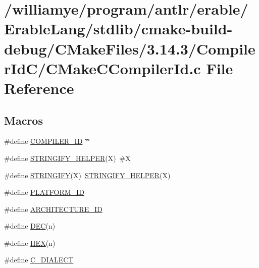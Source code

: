 \hypertarget{stdlib_2cmake-build-debug_2_c_make_files_23_814_83_2_compiler_id_c_2_c_make_c_compiler_id_8c}{}\section{/williamye/program/antlr/erable/\+Erable\+Lang/stdlib/cmake-\/build-\/debug/\+C\+Make\+Files/3.14.3/\+Compiler\+Id\+C/\+C\+Make\+C\+Compiler\+Id.c File Reference}
\label{stdlib_2cmake-build-debug_2_c_make_files_23_814_83_2_compiler_id_c_2_c_make_c_compiler_id_8c}
\subsection*{Macros}
\begin{DoxyCompactItemize}
\item 
\#define \mbox{\hyperlink{stdlib_2cmake-build-debug_2_c_make_files_23_814_83_2_compiler_id_c_2_c_make_c_compiler_id_8c_a81dee0709ded976b2e0319239f72d174}{C\+O\+M\+P\+I\+L\+E\+R\+\_\+\+ID}}~\char`\"{}\char`\"{}
\item 
\#define \mbox{\hyperlink{stdlib_2cmake-build-debug_2_c_make_files_23_814_83_2_compiler_id_c_2_c_make_c_compiler_id_8c_a2ae9b72bb13abaabfcf2ee0ba7d3fa1d}{S\+T\+R\+I\+N\+G\+I\+F\+Y\+\_\+\+H\+E\+L\+P\+ER}}(X)~\#X
\item 
\#define \mbox{\hyperlink{stdlib_2cmake-build-debug_2_c_make_files_23_814_83_2_compiler_id_c_2_c_make_c_compiler_id_8c_a43e1cad902b6477bec893cb6430bd6c8}{S\+T\+R\+I\+N\+G\+I\+FY}}(X)~\mbox{\hyperlink{_v_m_2cmake-build-debug_2_c_make_files_23_814_83_2_compiler_id_c_x_x_2_c_make_c_x_x_compiler_id_8cpp_a2ae9b72bb13abaabfcf2ee0ba7d3fa1d}{S\+T\+R\+I\+N\+G\+I\+F\+Y\+\_\+\+H\+E\+L\+P\+ER}}(X)
\item 
\#define \mbox{\hyperlink{stdlib_2cmake-build-debug_2_c_make_files_23_814_83_2_compiler_id_c_2_c_make_c_compiler_id_8c_adbc5372f40838899018fadbc89bd588b}{P\+L\+A\+T\+F\+O\+R\+M\+\_\+\+ID}}
\item 
\#define \mbox{\hyperlink{stdlib_2cmake-build-debug_2_c_make_files_23_814_83_2_compiler_id_c_2_c_make_c_compiler_id_8c_aba35d0d200deaeb06aee95ca297acb28}{A\+R\+C\+H\+I\+T\+E\+C\+T\+U\+R\+E\+\_\+\+ID}}
\item 
\#define \mbox{\hyperlink{stdlib_2cmake-build-debug_2_c_make_files_23_814_83_2_compiler_id_c_2_c_make_c_compiler_id_8c_ad1280362da42492bbc11aa78cbf776ad}{D\+EC}}(n)
\item 
\#define \mbox{\hyperlink{stdlib_2cmake-build-debug_2_c_make_files_23_814_83_2_compiler_id_c_2_c_make_c_compiler_id_8c_a46d5d95daa1bef867bd0179594310ed5}{H\+EX}}(n)
\item 
\#define \mbox{\hyperlink{stdlib_2cmake-build-debug_2_c_make_files_23_814_83_2_compiler_id_c_2_c_make_c_compiler_id_8c_a07f8e5783674099cd7f5110e22a78cdb}{C\+\_\+\+D\+I\+A\+L\+E\+CT}}
\end{DoxyCompactItemize}
